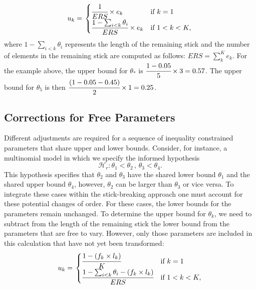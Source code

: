 \begin{appendix}
\begin{align}
  u_k = \left.
  \begin{cases}
      \cfrac{1}{ERS} \times e_k & \text{if } k = 1 \\
      \cfrac{1 - \sum_{i < k} \theta_i}{ERS} \times e_k & \text{if } 1 < k < K,
  \end{cases}
    \right.
\end{align} where \(1 - \sum_{i < k} \theta_i\) represents the length of
the remaining stick and the number of elements in the remaining stick
are computed as follows: \(ERS = \sum_k^{K} e_k\). For the example
above, the upper bound for \(\theta_*\) is
\(\cfrac{1 - 0.05}{5} \times 3 = 0.57\). The upper bound for
\(\theta_5\) is then \(\cfrac{(1 - 0.05 - 0.45)}{2} \times 1 = 0.25\).

\hypertarget{corrections-for-free-parameters}{%
\subsection{Corrections for Free
Parameters}\label{corrections-for-free-parameters}}

Different adjustments are required for a sequence of inequality
constrained parameters that share upper and lower bounds. Consider, for
instance, a multinomial model in which we specify the informed
hypothesis
\[\mathcal{H}_r: \theta_1 < \theta_2 \, , \, \theta_3 < \theta_4.\] This
hypothesis specifies that \(\theta_2\) and \(\theta_3\) have the shared
lower bound \(\theta_1\) and the shared upper bound \(\theta_4\),
however, \(\theta_2\) can be larger than \(\theta_3\) or vice versa. To
integrate these cases within the stick-breaking approach one must
account for these potential changes of order. For these cases, the lower
bounds for the parameters remain unchanged. To determine the upper bound
for \(\theta_k\), we need to subtract from the length of the remaining
stick the lower bound from the parameters that are free to vary.
However, only those parameters are included in this calculation that
have not yet been transformed: \begin{align}
  u_k = \left.
  \begin{cases}
      \cfrac{1 - (f_k \times l_k)}{K} & \text{if } k = 1 \\
      \cfrac{1 - \sum_{i < k} \theta_i - (f_k \times l_k)}{ERS} & \text{if } 1 < k < K,
  \end{cases}
    \right.
\end{align}


\end{appendix}
